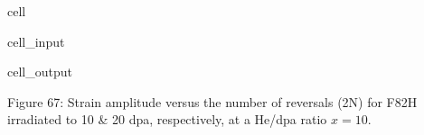 \documentclass[letterpaper,10pt,english]{jupyterBook}
\begin{document}
\begin{sphinxuseclass}{cell}
\begin{sphinxVerbatimInput}
\begin{sphinxuseclass}{cell_input}
		\end{sphinxuseclass}\end{sphinxVerbatimInput}
		\begin{sphinxVerbatimOutput}
			
			\begin{sphinxuseclass}{cell_output}
				\noindent{}
				
				\noindent{}
				
		\end{sphinxuseclass}\end{sphinxVerbatimOutput}
		
	\end{sphinxuseclass}
	\sphinxAtStartPar
	Figure 67: Strain amplitude versus the number of reversals (2N) for F82H irradiated to 10 \& 20 dpa, respectively, at a He/dpa ratio \(x = 10\).
	
\end{document}
